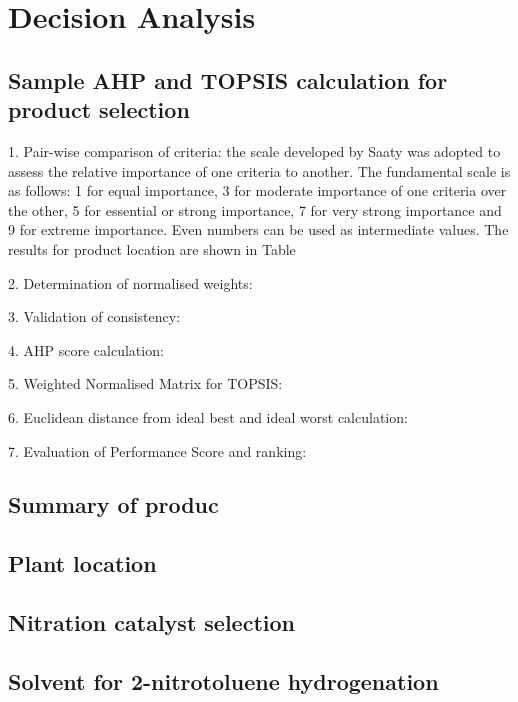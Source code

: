 \section{Decision Analysis}
\label{app:matrix}

\subsection{Sample AHP and TOPSIS calculation for product selection}

1. Pair-wise comparison of criteria: the scale developed by Saaty was adopted to assess the relative importance of one criteria to another. The fundamental scale is as follows: 1 for equal importance, 3 for moderate importance of one criteria over the other, 5 for essential or strong importance, 7 for very strong importance and 9 for extreme importance. Even numbers can be used as intermediate values. The results for product location are shown in Table

2. Determination of normalised weights:

3. Validation of consistency:

4. AHP score calculation:

5. Weighted Normalised Matrix for TOPSIS:

6. Euclidean distance from ideal best and ideal worst calculation:

7. Evaluation of Performance Score and ranking:

\subsection{Summary of produc}

\subsection{Plant location}

\subsection{Nitration catalyst selection}

\subsection{Solvent for 2-nitrotoluene hydrogenation}

